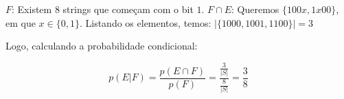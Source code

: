 \item
$F$: Existem $8$ strings que começam com o bit $1$.
$F \cap E$: Queremos $\{ 100x, 1x00 \}$, em que $x \in \{ 0,1 \}$. Listando os elementos, temos:
$|\{ 1000, 1001, 1100 \}| = 3$

Logo, calculando a probabilidade condicional:

\[p(E|F) = \frac{{p(E \cap F)}}{{p(F)}} = \frac{{\frac{3}{{|S|}}}}{{\frac{8}{{|S|}}}} = \frac{3}{8}\]
